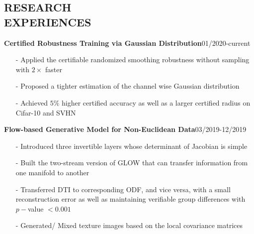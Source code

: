 \documentclass[margin]{res}
\begin{document}
\begin{resume}
\section{RESEARCH \\ EXPERIENCES}
                \textbf{Certified Robustness Training via Gaussian Distribution}\hfill 01/2020-current
                \begin{itemize}\itemsep -2.2pt %
                 \item[-] Applied the certifiable randomized smoothing robustness without sampling with $2\times$ faster
                 \item[-] Proposed a tighter estimation of the channel wise Gaussian distribution
                 \item[-] Achieved $5\%$ higher certified accuracy as well as a larger certified radius on Cifar-10 and SVHN
                 \end{itemize}

                \textbf{Flow-based Generative Model for Non-Euclidean Data}\hfill 03/2019-12/2019
                \begin{itemize}\itemsep -2.2pt %
                 \item[-] Introduced three invertible layers whose determinant of Jacobian is simple
                 \item[-] Built the two-stream version of GLOW that can transfer information from one manifold to another
                 \item[-] Transferred DTI to corresponding ODF, and vice versa, with a small reconstruction error as well as maintaining verifiable group differences with $p-$value $<0.001$
                 \item[-] Generated/ Mixed texture images based on the local covariance matrices
                 \end{itemize}



\end{resume}
\end{document}
